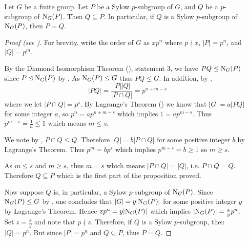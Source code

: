 \begin{proposition}\label{prop-normalizer-of-sylow-p-subgroup}
    Let $G$ be a finite group. Let $P$ be a Sylow $p$-subgroup of $G$, and $Q$ be a $p$-subgroup of $\mathrm{N}_{G}(P)$. Then $Q \subseteq P$. In particular, if $Q$ is a Sylow $p$-subgroup of $\mathrm{N}_{G}(P)$, then $P = Q$.
\end{proposition}
\begin{proof}[Proof (see {\cite[Proposition 11.9]{humphreys_1996}})]
    For brevity, write the order of $G$ as $xp^n$ where $p \nmid x$, $|P| = p^n$, and $|Q| = p^m$.

    By the Diamond Isomorphism Theorem (), statement 3, we have $PQ \leq \mathrm{N}_{G}(P)$ since $P \unlhd \mathrm{N}_{G}(P)$ by . As $\mathrm{N}_{G}(P) \leq G$ thus $PQ \leq G$. In addition, by ,
    \[
        |PQ| = \frac{|P||Q|}{|P \cap Q|} = p^{n+m-s}
    \]
    where we let $|P \cap Q| = p^s$. By Lagrange's Theorem () we know that $|G| = a|PQ|$ for some integer $a$, so $p^n = ap^{n+m-s}$ which implies $1 = ap^{m-s}$. Thus $p^{m-s} = \frac 1a \leq 1$ which means $m \leq s$.

    We note by , $P \cap Q \leq Q$. Therefore $|Q| = b|P\cap Q|$ for some positive integer $b$ by Lagrange's Theorem. Thus $p^m = bp^s$ which implies $p^{m-s} = b \geq 1$ so $m \geq s$.

    As $m \leq s$ and $m \geq s$, thus $m = s$ which means $|P \cap Q| = |Q|$, i.e. $P \cap Q = Q$. Therefore $Q \subseteq P$ which is the first part of the proposition proved.

    Now suppose $Q$ is, in particular, a Sylow $p$-subgroup of $\mathrm{N}_{G}(P)$. Since $\mathrm{N}_{G}(P) \leq G$ by , one concludes that $|G| = y|\mathrm{N}_{G}(P)|$ for some positive integer $y$ by Lagrange's Theorem. Hence $xp^n = y|\mathrm{N}_{G}(P)|$ which implies $|\mathrm{N}_{G}(P)| = \frac{x}{y} p^n$. Set $z = \frac xy$ and note that $p \nmid z$. Therefore, if $Q$ is a Sylow $p$-subgroup, then $|Q| = p^n$. But since $|P| = p^n$ and $Q \subseteq P$, thus $P = Q$.
\end{proof}

